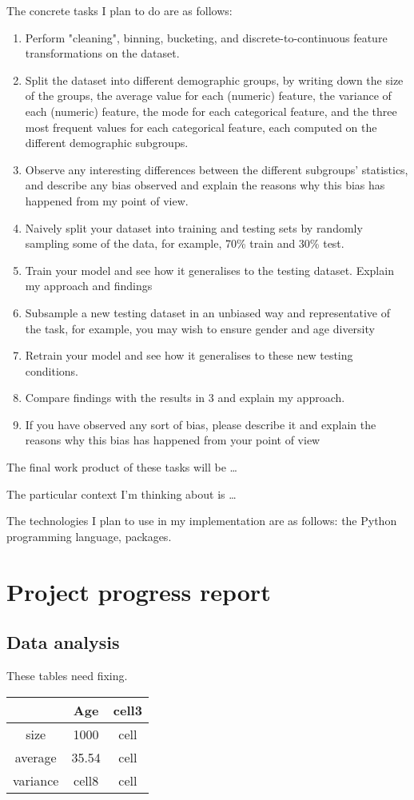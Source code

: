 \documentclass[conference]{IEEEtran}
\begin{document}
The concrete tasks I plan to do are as follows:
\begin{enumerate}
    \item Perform "cleaning", binning, bucketing, and discrete-to-continuous feature transformations on the dataset.
    \item Split the dataset into different demographic groups, by writing down the size of the groups, the average value for each (numeric) feature, the variance of each (numeric) feature, the mode for each categorical feature, and the three most frequent values for each categorical feature, each computed on the different demographic subgroups.
    \item Observe any interesting differences between the different
    subgroups’ statistics, and describe any bias observed and explain the reasons why this bias has happened from my point of view.
    \item Naively split your dataset into training and testing sets by randomly sampling some of the data, for example, 70\% train and 30\% test.
    \item Train your model and see how it generalises to the testing dataset. Explain my approach and findings
    \item Subsample a new testing dataset in an unbiased way and representative of the task, for example, you may wish to ensure gender and age diversity
    \item Retrain your model and see how it generalises to these
    new testing conditions. 
    \item Compare findings with the results in 3 and explain my approach.
    \item If you have observed any sort of bias, please describe it and explain the reasons why this bias has happened from your point of view
\end{enumerate}

The final work product of these tasks will be \dots

The particular context I'm thinking about is \dots

The technologies I plan to use in my implementation are as follows: the Python programming language, packages. 

\section{Project progress report}
\subsection{Data analysis}
These tables need fixing.
\begin{center}
    \begin{tabular}{ |c|c|c| } 
        \hline
        & Age & cell3 \\ 
        \hline
        size     & 1000 & cell \\ 
        average  & 35.54 & cell \\ 
        variance & cell8 & cell \\ 
        \hline
    \end{tabular}
\end{center}
\end{document}
